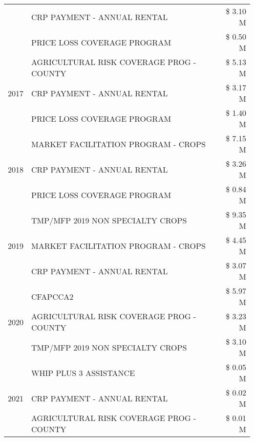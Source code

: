 \begin{tabular}{llr}
 & CRP PAYMENT - ANNUAL RENTAL                   & \$ 3.10 M \\
 & PRICE LOSS COVERAGE PROGRAM                   & \$ 0.50 M \\
\cline{1-3}
\multirow[t]{3}{*}{2017} & AGRICULTURAL RISK COVERAGE PROG - COUNTY & \$ 5.13 M \\
 & CRP PAYMENT - ANNUAL RENTAL & \$ 3.17 M \\
 & PRICE LOSS COVERAGE PROGRAM & \$ 1.40 M \\
\cline{1-3}
\multirow[t]{3}{*}{2018} & MARKET FACILITATION PROGRAM - CROPS & \$ 7.15 M \\
 & CRP PAYMENT - ANNUAL RENTAL & \$ 3.26 M \\
 & PRICE LOSS COVERAGE PROGRAM & \$ 0.84 M \\
\cline{1-3}
\multirow[t]{3}{*}{2019} & TMP/MFP 2019 NON SPECIALTY CROPS & \$ 9.35 M \\
 & MARKET FACILITATION PROGRAM - CROPS & \$ 4.45 M \\
 & CRP PAYMENT - ANNUAL RENTAL & \$ 3.07 M \\
\cline{1-3}
\multirow[t]{3}{*}{2020} & CFAPCCA2 & \$ 5.97 M \\
 & AGRICULTURAL RISK COVERAGE PROG - COUNTY & \$ 3.23 M \\
 & TMP/MFP 2019 NON SPECIALTY CROPS & \$ 3.10 M \\
\cline{1-3}
\multirow[t]{3}{*}{2021} & WHIP PLUS 3 ASSISTANCE & \$ 0.05 M \\
 & CRP PAYMENT - ANNUAL RENTAL & \$ 0.02 M \\
 & AGRICULTURAL RISK COVERAGE PROG - COUNTY & \$ 0.01 M \\
\cline{1-3}
\bottomrule
\end{tabular}
